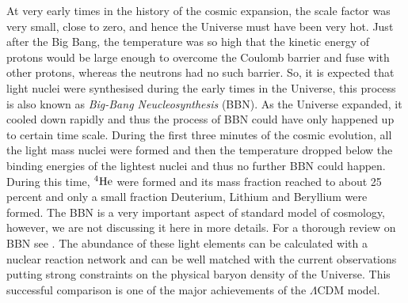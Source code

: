 At  very early times in the history of the cosmic expansion, the scale factor 
was very small, close to zero, and hence the Universe must have been very hot. Just
after the Big Bang, the temperature was so high that the kinetic energy
of protons would be large enough to overcome the Coulomb barrier and fuse with other
protons, whereas the neutrons had no such barrier. So, it is expected that
light nuclei were synthesised during the early times in the Universe, this
process is also known as {\it Big-Bang Neucleosynthesis} (BBN). 
As the Universe expanded, 
it cooled down rapidly and thus the process of BBN could have only
happened up to certain time scale. During the first three minutes of the cosmic
evolution, all the light mass nuclei were formed and then the temperature
dropped below the binding energies of the lightest nuclei and thus no
further BBN could happen. During this time, $^4{\rm He}$ were formed and 
its mass fraction reached to about 25 percent and only a small fraction 
Deuterium, Lithium and Beryllium were formed. 
The BBN is a very important
aspect of standard model of cosmology, however, we are not discussing it here in more
details. For a thorough review on BBN
see \cite{2000PhST...85...12T,2006astro.ph..1514F}. The abundance of these light elements 
can be calculated with a nuclear reaction network and can be well matched
with the current observations putting strong constraints on the physical
baryon density of the Universe. This successful comparison is one of the major
achievements of the $\Lambda$CDM model.

